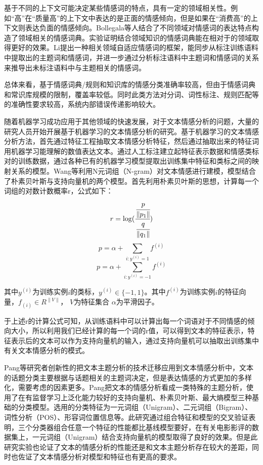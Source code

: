 基于不同的上下文可能决定某些情感词的特点，具有一定的领域相关性。例如“高”在“质量高”的上下文中表达的是正面的情感倾向，但是如果在“消费高”的上下文则表达负面的情感倾向。Bollegala等人结合了不同领域对情感词的表达特点构造了领域相关的情感词典。实验证明结合领域知识的情感词典能在相对于的领域取得更好的效果。Li提出一种相关领域自适应情感词的框架，能同步从标注训练语料中提取出的主题词和情感词，并进一步通过分析标注语料中主题词和情感词的关系来推导出未标注语料中与主题相关的情感词。

总体来看，基于情感词典/规则和知识库的情感分类准确率较高，但由于情感词典和常识库规模的限制，覆盖率较低。同时此类方法对分词、词性标注、规则匹配等的准确性要求较高，系统内部错误传递影响较大。


随着机器学习成功应用于其他领域的快速发展，对于文本情感分析的问题，大量的研究人员开始开展基于机器学习的文本情感分析的研究。基于机器学习的文本情感分析方法，首先通过特征工程抽取文本情感分析特征，然后通过抽取出来的特征词用机器学习能理解的数值表达文本。通过人工标注建立起特征表示数据和情感类标对的训练数据，通过各种已有的机器学习模型提取出训练集中特征和类标之间的映射关系的模型。Wang等利用N元词组（N-gram）对文本情感进行建模，模型结合了朴素贝叶斯与支持向量机的两个模型。首先利用朴素贝叶斯的思想，计算每一个词组的对数计数概率r，公式如下：
\begin{equation}\label{f1favor}r=\log(\cfrac{\cfrac{p}{\|p_1\|}}{\cfrac{q}{\|q_1\|}})\end{equation}
\begin{equation}\label{f1favor}p=\alpha + \sum_{i:y^{(i)}=1}f^{(i)}\end{equation}
\begin{equation}\label{f1favor}p=\alpha + \sum_{i:y^{(i)}=-1}f^{(i)}\end{equation}

其中$y^{(i)}$为训练实例$i$的类标，$y^{(i)}\in\lbrace-1,1\rbrace$。其中$f^{(i)}$为训练实例$i$的特征向量，$f_{(i)}\in R^{\|V\|}$， $V$为特征集合 $\alpha$为平滑因子。

于上述r的计算公式可知，从训练语料中可以计算出每一个词语对于不同情感的倾向大小，所以利用我们已经计算的每一个词的r值，可以得到文本的特征表示，特征表示后的文本可以作为支持向量机的输入，通过支持向量机可以抽取出训练集中有关文本情感分析的模式。

Pang等研究者创新性的把文本主题分析的技术迁移应用到文本情感分析中，文本的话题分类主要根据与话题相关的主题词决定，但是表达情感的方式更加的多样化，需要考虑的因素更多。Pang把文本的情感分析看成一类特殊的主题分析，使用了在有监督学习上泛化能力较好的支持向量机、朴素贝叶斯、最大熵模型三种基础的分类模型。选用的分类特征为一元词组（Unigram）、二元词组（Bigram）、词性分析（POS）、形容词位置信息等。此研究通过组合特征和模型的交叉验证表明，三个分类器组合任意一个特征的性能都比基线模型要好，在有关电影影评的数据集上，一元词组（Unigram）结合支持向量机的模型取得了良好的效果。但是此研究实验也论证了文本的情感分析的性能还是和文本主题分析存在较大的差距，同时也佐证了文本情感分析对模型和特征也有更高的要求。

